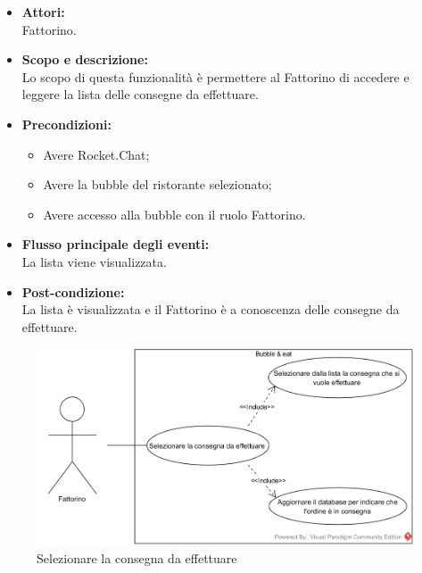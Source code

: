 
\begin{itemize}
	\item \textbf{Attori:}
	\\Fattorino.
	\item \textbf{Scopo e descrizione:} 
	\\Lo scopo di questa funzionalità è permettere al Fattorino di accedere e leggere la lista delle consegne da effettuare.
	\item \textbf{Precondizioni:}
	\begin{itemize}
		\item Avere Rocket.Chat;
		\item Avere la bubble del ristorante selezionato;
		\item Avere accesso alla bubble con il ruolo Fattorino.
	\end{itemize}
	\item \textbf{Flusso principale degli eventi:}
	\\La lista viene visualizzata.
	\item \textbf{Post-condizione:}
	\\La lista è visualizzata e il Fattorino è a conoscenza delle consegne da effettuare.
\end{itemize}


\begin{figure}[H]
	\centering
	\includegraphics[width=15cm]{../../documenti/AnalisiDeiRequisiti/Diagrammi_img/uc3_10.png}
	\caption{\UCCaption{} Selezionare la consegna da effettuare}
\end{figure}

